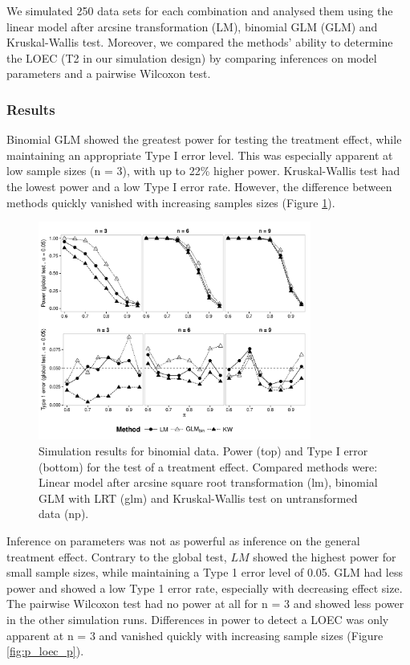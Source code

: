 \documentclass{scrartcl}
\begin{document}
We simulated 250 data sets for each combination and analysed them using the linear model after arcsine transformation (LM), binomial GLM (GLM) and Kruskal-Wallis test.
Moreover, we compared the methods' ability to determine the LOEC (T2 in our simulation design) by comparing inferences on model parameters and a pairwise Wilcoxon test. 


\subsubsection{Results}
Binomial GLM showed the greatest power for testing the treatment effect, while maintaining an appropriate Type I error level.
This was especially apparent at low sample sizes (n = 3), with up to 22\% higher power.
Kruskal-Wallis test had the lowest power and a low Type I error rate.
However, the difference between methods quickly vanished with increasing samples sizes (Figure \ref{fig:p_glob_p}).

\begin{figure}[h]
  \centering
  \includegraphics[width = 0.8\textwidth]{p_glob_p.pdf}
  \caption{Simulation results for binomial data. Power (top) and Type I error (bottom) for the test of a treatment effect. Compared methods were: Linear model after arcsine square root transformation (lm), binomial GLM with LRT (glm) and Kruskal-Wallis test on untransformed data (np).}
  \label{fig:p_glob_p}
\end{figure}

Inference on parameters was not as powerful as inference on the general treatment effect.
Contrary to the global test, $LM$ showed the highest power for small sample sizes, while maintaining a Type 1 error level of 0.05.
GLM had less power and showed a low Type 1 error rate, especially with decreasing effect size.
The pairwise Wilcoxon test had no power at all for n = 3 and showed less power in the other simulation runs.
Differences in power to detect a LOEC was only apparent at n = 3 and vanished quickly with increasing sample sizes (Figure \ref{fig:p_loec_p}). 
\end{document}
